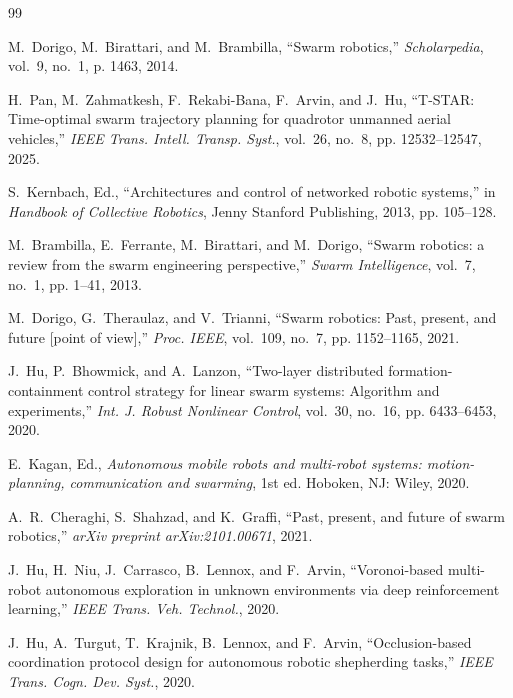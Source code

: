 \documentclass[letterpaper, 10pt, conference]{IEEEtran}
\begin{document}
\begin{thebibliography}{99}

M.~Dorigo, M.~Birattari, and M.~Brambilla, ``Swarm robotics,'' \emph{Scholarpedia}, vol.~9, no.~1, p. 1463, 2014.

H.~Pan, M.~Zahmatkesh, F.~Rekabi-Bana, F.~Arvin, and J.~Hu, ``T-STAR: Time-optimal swarm trajectory planning for quadrotor unmanned aerial vehicles,'' \emph{IEEE Trans. Intell. Transp. Syst.}, vol.~26, no.~8, pp. 12532--12547, 2025.

S.~Kernbach, Ed., ``Architectures and control of networked robotic systems,'' in \emph{Handbook of Collective Robotics}, Jenny Stanford Publishing, 2013, pp. 105--128.

M.~Brambilla, E.~Ferrante, M.~Birattari, and M.~Dorigo, ``Swarm robotics: a review from the swarm engineering perspective,'' \emph{Swarm Intelligence}, vol.~7, no.~1, pp. 1--41, 2013.

M.~Dorigo, G.~Theraulaz, and V.~Trianni, ``Swarm robotics: Past, present, and future [point of view],'' \emph{Proc. IEEE}, vol.~109, no.~7, pp. 1152--1165, 2021.

J.~Hu, P.~Bhowmick, and A.~Lanzon, ``Two-layer distributed formation-containment control strategy for linear swarm systems: Algorithm and experiments,'' \emph{Int. J. Robust Nonlinear Control}, vol.~30, no.~16, pp. 6433--6453, 2020.

E.~Kagan, Ed., \emph{Autonomous mobile robots and multi-robot systems: motion-planning, communication and swarming}, 1st ed. Hoboken, NJ: Wiley, 2020.

A.~R.~Cheraghi, S.~Shahzad, and K.~Graffi, ``Past, present, and future of swarm robotics,'' \emph{arXiv preprint arXiv:2101.00671}, 2021.

J.~Hu, H.~Niu, J.~Carrasco, B.~Lennox, and F.~Arvin, ``Voronoi-based multi-robot autonomous exploration in unknown environments via deep reinforcement learning,'' \emph{IEEE Trans. Veh. Technol.}, 2020.

J.~Hu, A.~Turgut, T.~Krajnik, B.~Lennox, and F.~Arvin, ``Occlusion-based coordination protocol design for autonomous robotic shepherding tasks,'' \emph{IEEE Trans. Cogn. Dev. Syst.}, 2020.


\end{thebibliography}
\end{document}
